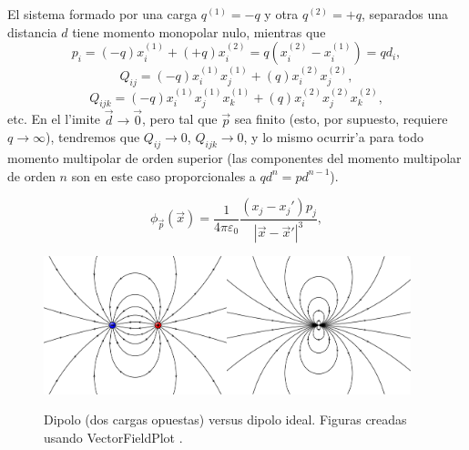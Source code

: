 El sistema formado por una carga $q^{(1)}=-q$ y otra $q^{(2)}=+q$, separados una distancia $d$ tiene momento monopolar nulo, mientras que 
\begin{equation}
p_i=(-q)x^{(1)}_i+(+q)x^{(2)}_i=q(x^{(2)}_i-x^{(1)}_i)=qd_i,
\end{equation}
\begin{equation}
Q_{ij}=(-q)x^{(1)}_i x^{(1)}_j +(q)x^{(2)}_i x^{(2)}_j,
\end{equation}
\begin{equation}
Q_{ijk}=(-q)x^{(1)}_i x^{(1)}_jx^{(1)}_k +(q)x^{(2)}_i x^{(2)}_jx^{(2)}_k,
\end{equation}
etc. En el l'imite $\vec{d}\to\vec{0}$, pero tal que $\vec{p}$ sea finito (esto, por supuesto, requiere $q\to\infty$), tendremos que $Q_{ij}\to 0$, $Q_{ijk}\to 0$, y lo mismo ocurrir'a para todo momento multipolar de orden superior  (las componentes del momento multipolar de orden $n$ son en este caso proporcionales a $qd^n=pd^{n-1}$).

\begin{equation}\label{phip}
\phi_{\vec{p}}(\vec{x})=\frac{1}{4\pi\varepsilon_0}\frac{(x_j-x_j')p_j}
{|\vec{x}-\vec{x}'|^3},
\end{equation}
\begin{figure}[H]
\begin{center}
\includegraphics[height=4cm]{fig/fig-E-02.pdf}\hspace{1cm}\includegraphics[height=4cm]{fig/fig-campo-dipolo-electrico.pdf} 
\caption{Dipolo (dos cargas opuestas) versus dipolo ideal. Figuras creadas usando VectorFieldPlot \cite{VFP}.}
\label{fig-dipolos}
\end{center}
\end{figure}
